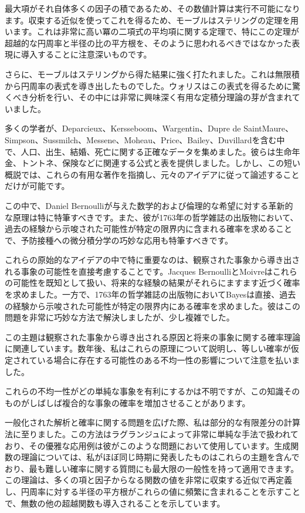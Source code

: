 \documentclass[a4paper,11pt,openany]{ltjsbook}
\begin{document}
最大項がそれ自体多くの因子の積であるため、その数値計算は実行不可能になります。収束する近似を使ってこれを得るため、モーブルはステリングの定理を用います。これは非常に高い冪の二項式の平均項に関する定理で、特にこの定理が超越的な円周率と半径の比の平方根を、そのように思われるべきではなかった表現に導入することに注意深いものです。

さらに、モーブルはステリングから得た結果に強く打たれました。これは無限積から円周率の表式を導き出したものでした。ウォリスはこの表式を得るために驚くべき分析を行い、その中には非常に興味深く有用な定積分理論の芽が含まれていました。

多くの学者が、Deparcieux、Kersseboom、Wargentin、Dupre de SaintMaure、Simpson、Sussmilch、Messene、Moheau、Price、Bailey、Duvillardを含む中で、人口、出生、結婚、死亡に関する正確なデータを集めました。彼らは生命年金、トントネ、保険などに関連する公式と表を提供しました。しかし、この短い概説では、これらの有用な著作を指摘し、元々のアイデアに従って論述することだけが可能です。

この中で、Daniel Bernoulliが与えた数学的および倫理的な希望に対する革新的な原理は特に特筆すべきです。また、彼が1763年の哲学雑誌の出版物において、過去の経験から示唆された可能性が特定の限界内に含まれる確率を求めることで、予防接種への微分積分学の巧妙な応用も特筆すべきです。

これらの原始的なアイデアの中で特に重要なのは、観察された事象から導き出される事象の可能性を直接考慮することです。Jacques BernoulliとMoivreはこれらの可能性を既知として扱い、将来的な経験の結果がそれらにますます近づく確率を求めました。一方で、1763年の哲学雑誌の出版物においてBayesは直接、過去の経験から示唆された可能性が特定の限界内にある確率を求めました。彼はこの問題を非常に巧妙な方法で解決しましたが、少し複雑でした。

この主題は観察された事象から導き出される原因と将来の事象に関する確率理論に関連しています。数年後、私はこれらの原理について説明し、等しい確率が仮定されている場合に存在する可能性のある不均一性の影響について注意を払いました。

これらの不均一性がどの単純な事象を有利にするかは不明ですが、この知識そのものがしばしば複合的な事象の確率を増加させることがあります。

一般化された解析と確率に関する問題を広げた際、私は部分的な有限差分の計算法に至りました。この方法はラグランジュによって非常に単純な手法で扱われており、その優雅な応用例は彼がこのような問題において使用しています。生成関数の理論については、私がほぼ同じ時期に発表したものはこれらの主題を含んでおり、最も難しい確率に関する質問にも最大限の一般性を持って適用できます。この理論は、多くの項と因子からなる関数の値を非常に収束する近似で再定義し、円周率に対する半径の平方根がこれらの値に頻繁に含まれることを示すことで、無数の他の超越関数も導入されることを示しています。
\end{document}
